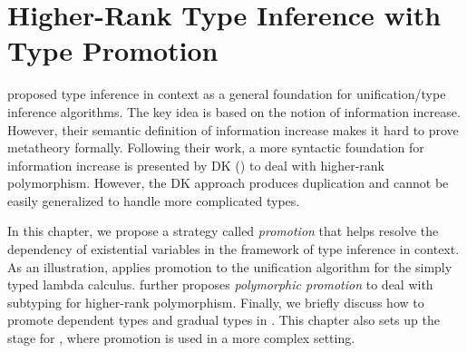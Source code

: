 \chapter{Higher-Rank Type Inference with Type Promotion}
\label{chap:Promotion}

\cite{gundry2010type} proposed type inference in context as a general foundation
for unification/type inference algorithms. The key idea is based on the notion
of information increase. However, their semantic definition of information
increase makes it hard to prove metatheory formally. Following their work, a
more syntactic foundation for information increase is presented by DK
(\cite{DK}) to deal with higher-rank polymorphism. However, the DK approach
produces duplication and cannot be easily generalized to handle more complicated
types.

In this chapter, we propose a strategy called \textit{promotion} that helps
resolve the dependency of existential variables in the framework of type
inference in context. As an illustration,  applies promotion
to the unification algorithm for the simply typed lambda calculus.
 further proposes \textit{polymorphic promotion} to deal
with subtyping for higher-rank polymorphism. Finally, we briefly discuss how to promote
dependent types and gradual types in .
This chapter also sets up the stage for , where
promotion is used in a more complex setting.







